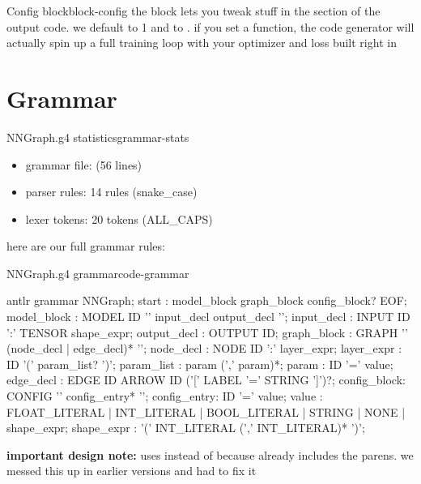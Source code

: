 \documentclass{nngraph-en}
\begin{document}
\begin{dfnbox}{Config block}{block-config}
the  block lets you tweak stuff in the  section of the output code. we default  to 1 and  to . if you set a  function, the code generator will actually spin up a full training loop with your optimizer and loss built right in
\end{dfnbox}

\section{Grammar}

\begin{dfnbox}{NNGraph.g4 statistics}{grammar-stats}
\begin{itemize}[noitemsep]
    \item grammar file:  (56 lines)
    \item parser rules: 14 rules (snake\_case)
    \item lexer tokens: 20 tokens (ALL\_CAPS)
\end{itemize}
\end{dfnbox}

here are our full grammar rules:

\begin{codebox}{NNGraph.g4 grammar}{code-grammar}
\begin{amzcode}{antlr}
grammar NNGraph;
start     : model_block graph_block config_block? EOF;
model_block : MODEL ID '{' input_decl output_decl '}';
input_decl  : INPUT ID ':' TENSOR shape_expr;
output_decl : OUTPUT ID;
graph_block : GRAPH '{' (node_decl | edge_decl)* '}';
node_decl   : NODE ID ':' layer_expr;
layer_expr  : ID '(' param_list? ')';
param_list  : param (',' param)*;
param       : ID '=' value;
edge_decl   : EDGE ID ARROW ID ('[' LABEL '=' STRING ']')?;
config_block: CONFIG '{' config_entry* '}';
config_entry: ID '=' value;
value       : FLOAT_LITERAL | INT_LITERAL | BOOL_LITERAL
            | STRING | NONE | shape_expr;
shape_expr  : '(' INT_LITERAL (',' INT_LITERAL)* ')';
\end{amzcode}
\end{codebox}

\begin{notebox}
\textbf{important design note:}  uses  instead of  because  already includes the parens. we messed this up in earlier versions and had to fix it
\end{notebox}
\end{document}
